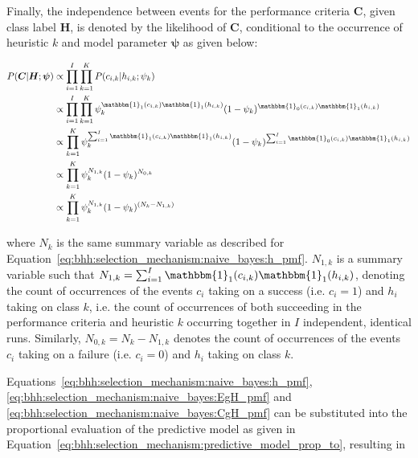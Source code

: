 \documentclass[preprint,review,12pt]{elsarticle}
\begin{document}
Finally, the independence between events for the performance criteria $\boldsymbol{C}$, given class label $\boldsymbol{H}$, is denoted by the likelihood of $\boldsymbol{C}$, conditional to the occurrence of heuristic $k$ and model parameter $\boldsymbol{\psi}$ as given below:

\begin{equation}
	\label{eq:bhh:selection_mechanism:naive_bayes:CgH_pmf}
	\begin{split}
		P(\boldsymbol{C} \vert \boldsymbol{H}; \boldsymbol{\psi})
		&\propto\prod_{i=1}^{I} \prod_{k=1}^{K} P(c_{i,k} \vert h_{i,k} ; \psi_{k})  \\
		&\propto \prod_{i=1}^{I} \prod_{k=1}^{K} \psi_{k}^{\mathbbm{1}_{1}(c_{i,k})\mathbbm{1}_{1}(h_{i,k})} (1 - \psi_{k})^{\mathbbm{1}_{0}(c_{i,k})\mathbbm{1}_{1}(h_{i,k})}\\
		&\propto \prod_{k=1}^{K} \psi_{k}^{\sum_{i=1}^{I} \mathbbm{1}_{1}(c_{i,k})\mathbbm{1}_{1}(h_{i,k})} (1 - \psi_{k})^{\sum_{i=1}^{I} \mathbbm{1}_{0}(c_{i,k})\mathbbm{1}_{1}(h_{i,k})}\\
		&\propto \prod_{k=1}^{K} \psi_{k}^{N_{1,k}} (1 - \psi_{k})^{N_{0,k}} \\
		&\propto \prod_{k=1}^{K} \psi_{k}^{N_{1,k}} (1 - \psi_{k})^{(N_{k} - N_{1,k})}
	\end{split}
\end{equation}

where $N_{k}$ is the same summary variable as described for Equation~\eqref{eq:bhh:selection_mechanism:naive_bayes:h_pmf}. $N_{1,k}$ is a summary variable such that $N_{1,k} = \sum_{i=1}^{I} \mathbbm{1}_{1}(c_{i,k})\mathbbm{1}_{1}(h_{i,k})$, denoting the count of occurrences of the events $c_{i}$ taking on a success (i.e. $c_{i}=1$) and $h_{i}$ taking on class $k$, i.e. the count of occurrences of both succeeding in the performance criteria and heuristic $k$ occurring together in $I$ independent, identical runs. Similarly, $N_{0,k} = N_{k} - N_{1,k}$ denotes the count of occurrences of the events $c_{i}$ taking on a failure (i.e. $c_{i}=0$) and $h_{i}$ taking on class $k$.

Equations~\eqref{eq:bhh:selection_mechanism:naive_bayes:h_pmf}, \eqref{eq:bhh:selection_mechanism:naive_bayes:EgH_pmf} and \eqref{eq:bhh:selection_mechanism:naive_bayes:CgH_pmf} can be substituted into the proportional evaluation of the predictive model as given in Equation~\eqref{eq:bhh:selection_mechanism:predictive_model_prop_to}, resulting in
\end{document}
